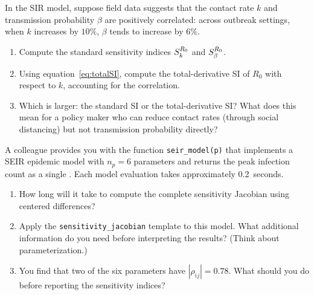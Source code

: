 \begin{exercise}[\bloom{L4}]
\label{ex:ch3:correlatedSIR}
In the SIR model, suppose field data suggests that the
contact rate $k$ and transmission probability $\beta$ are
positively correlated: across outbreak settings,
when $k$ increases by $10\%$, $\beta$ tends to increase by $6\%$.
\begin{enumerate}[label=(\alph*)]
  \item Compute the standard sensitivity indices $S_{k}^{R_0}$
        and $S_{\beta}^{R_0}$.
  \item Using equation~\eqref{eq:totalSI}, compute the total-derivative
        SI of $R_0$ with respect to $k$, accounting for the correlation.
  \item Which is larger: the standard SI or the total-derivative SI?
        What does this mean for a policy maker who can reduce
        contact rates (through social distancing) but not transmission
        probability directly?
\end{enumerate}
\end{exercise}

\begin{exercise}[\bloom{L4}]
\label{ex:ch3:blackbox}
A colleague provides you with the function \texttt{seir\_model(p)}
that implements a SEIR epidemic model with $n_p = 6$ parameters
and returns the peak infection count as a single \QOI.
Each model evaluation takes approximately 0.2~seconds.
\begin{enumerate}[label=(\alph*)]
  \item How long will it take to compute the complete sensitivity
        Jacobian using centered differences?
  \item Apply the \texttt{sensitivity\_jacobian} template to this model.
        What additional information do you need before interpreting
        the results? (Think about parameterization.)
  \item You find that two of the six parameters have
        $|\rho_{ij}| = 0.78$. What should you do before
        reporting the sensitivity indices?
\end{enumerate}
\end{exercise}

